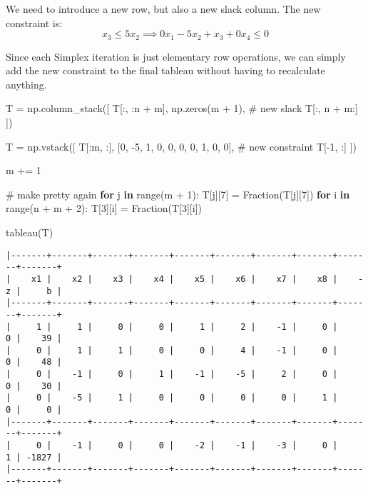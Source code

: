 \documentclass[
  letterpaper,
  DIV=11,
  numbers=noendperiod]{scrartcl}
\newenvironment{Shaded}{\begin{snugshade}}{\end{snugshade}}
\newcommand{\BuiltInTok}[1]{\textcolor[rgb]{0.00,0.23,0.31}{#1}}
\newcommand{\CommentTok}[1]{\textcolor[rgb]{0.37,0.37,0.37}{#1}}
\newcommand{\ControlFlowTok}[1]{\textcolor[rgb]{0.00,0.23,0.31}{\textbf{#1}}}
\newcommand{\DecValTok}[1]{\textcolor[rgb]{0.68,0.00,0.00}{#1}}
\newcommand{\KeywordTok}[1]{\textcolor[rgb]{0.00,0.23,0.31}{\textbf{#1}}}
\newcommand{\NormalTok}[1]{\textcolor[rgb]{0.00,0.23,0.31}{#1}}
\newcommand{\OperatorTok}[1]{\textcolor[rgb]{0.37,0.37,0.37}{#1}}
\begin{document}
We need to introduce a new row, but also a new slack column. The new
constraint is: \[
x_3 \le 5x_2 \implies 0x_1 - 5x_2 + x_3 + 0x_4 \le 0
\]

Since each Simplex iteration is just elementary row operations, we can
simply add the new constraint to the final tableau without having to
recalculate anything.

\small

\begin{Shaded}
\begin{Highlighting}[]
\NormalTok{T }\OperatorTok{=}\NormalTok{ np.column\_stack([}
\NormalTok{    T[:, :n }\OperatorTok{+}\NormalTok{ m],}
\NormalTok{    np.zeros(m }\OperatorTok{+} \DecValTok{1}\NormalTok{), }\CommentTok{\# new slack}
\NormalTok{    T[:, n }\OperatorTok{+}\NormalTok{ m:]}
\NormalTok{])}

\NormalTok{T }\OperatorTok{=}\NormalTok{ np.vstack([}
\NormalTok{    T[:m, :],}
\NormalTok{    [}\DecValTok{0}\NormalTok{, }\OperatorTok{{-}}\DecValTok{5}\NormalTok{, }\DecValTok{1}\NormalTok{, }\DecValTok{0}\NormalTok{, }\DecValTok{0}\NormalTok{, }\DecValTok{0}\NormalTok{, }\DecValTok{0}\NormalTok{, }\DecValTok{1}\NormalTok{, }\DecValTok{0}\NormalTok{, }\DecValTok{0}\NormalTok{], }\CommentTok{\# new constraint}
\NormalTok{    T[}\OperatorTok{{-}}\DecValTok{1}\NormalTok{, :]}
\NormalTok{])}

\NormalTok{m }\OperatorTok{+=} \DecValTok{1}

\CommentTok{\# make pretty again}
\ControlFlowTok{for}\NormalTok{ j }\KeywordTok{in} \BuiltInTok{range}\NormalTok{(m }\OperatorTok{+} \DecValTok{1}\NormalTok{):}
\NormalTok{    T[j][}\DecValTok{7}\NormalTok{] }\OperatorTok{=}\NormalTok{ Fraction(T[j][}\DecValTok{7}\NormalTok{])}
\ControlFlowTok{for}\NormalTok{ i }\KeywordTok{in} \BuiltInTok{range}\NormalTok{(n }\OperatorTok{+}\NormalTok{ m }\OperatorTok{+} \DecValTok{2}\NormalTok{):}
\NormalTok{    T[}\DecValTok{3}\NormalTok{][i] }\OperatorTok{=}\NormalTok{ Fraction(T[}\DecValTok{3}\NormalTok{][i])}

\NormalTok{tableau(T)}
\end{Highlighting}
\end{Shaded}

\begin{verbatim}
|-------+-------+-------+-------+-------+-------+-------+-------+-------+-------+
|    x1 |    x2 |    x3 |    x4 |    x5 |    x6 |    x7 |    x8 |    -z |     b |
|-------+-------+-------+-------+-------+-------+-------+-------+-------+-------+
|     1 |     1 |     0 |     0 |     1 |     2 |    -1 |     0 |     0 |    39 |
|     0 |     1 |     1 |     0 |     0 |     4 |    -1 |     0 |     0 |    48 |
|     0 |    -1 |     0 |     1 |    -1 |    -5 |     2 |     0 |     0 |    30 |
|     0 |    -5 |     1 |     0 |     0 |     0 |     0 |     1 |     0 |     0 |
|-------+-------+-------+-------+-------+-------+-------+-------+-------+-------+
|     0 |    -1 |     0 |     0 |    -2 |    -1 |    -3 |     0 |     1 | -1827 |
|-------+-------+-------+-------+-------+-------+-------+-------+-------+-------+
\end{verbatim}
\end{document}
